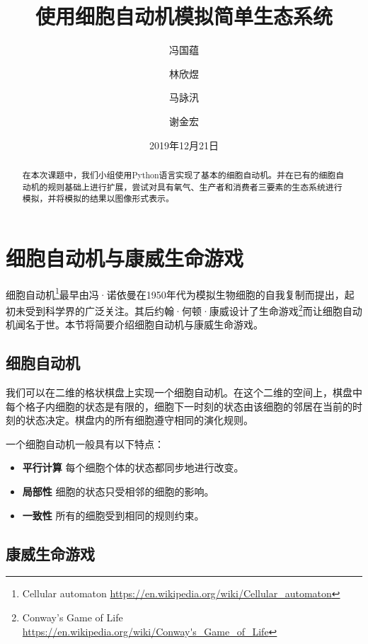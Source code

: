 \documentclass{ctexart}
\author{
	冯国蕴 \and 林欣煜 \and 马詠汛 \and 谢金宏
}
\title{使用细胞自动机模拟简单生态系统}
\date{2019年12月21日}
\begin{document}
\maketitle

\begin{abstract}
在本次课题中，我们小组使用Python语言实现了基本的细胞自动机。并在已有的细胞自动机的规则基础上进行扩展，尝试对具有氧气、生产者和消费者三要素的生态系统进行模拟，并将模拟的结果以图像形式表示。
\end{abstract}

\tableofcontents

\newpage

\listoffigures

\newpage

\section{细胞自动机与康威生命游戏}

细胞自动机\footnote{Cellular automaton \url{https://en.wikipedia.org/wiki/Cellular_automaton}}最早由冯·诺依曼在1950年代为模拟生物细胞的自我复制而提出，起初未受到科学界的广泛关注。其后约翰·何顿·康威设计了生命游戏\footnote{Conway's Game of Life \url{https://en.wikipedia.org/wiki/Conway's_Game_of_Life}}而让细胞自动机闻名于世。本节将简要介绍细胞自动机与康威生命游戏。

\subsection{细胞自动机}

我们可以在二维的格状棋盘上实现一个细胞自动机。在这个二维的空间上，棋盘中每个格子内细胞的状态是有限的，细胞下一时刻的状态由该细胞的邻居在当前的时刻的状态决定。棋盘内的所有细胞遵守相同的演化规则。

一个细胞自动机一般具有以下特点：

\begin{itemize}
  \item \textbf{平行计算 }每个细胞个体的状态都同步地进行改变。
  \item \textbf{局部性 }细胞的状态只受相邻的细胞的影响。
  \item \textbf{一致性 }所有的细胞受到相同的规则约束。
\end{itemize}

\subsection{康威生命游戏}
\end{document}
